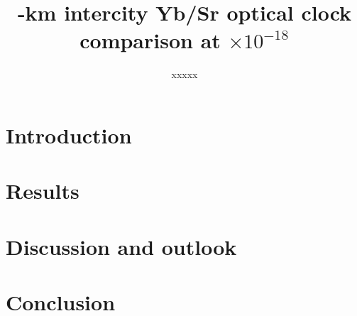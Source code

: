 \documentclass[11pt,a4paper]{article}
\title{\siteKm-km intercity Yb/Sr optical clock comparison at
\uTotalShort$\times10^{-18}$}
\author{%
  xxxxx%
}
\date{}
\begin{document}
\maketitle

\begin{abstract}
\sloppy

\end{abstract}

\section*{Introduction}
\label{sec:intro}


\section*{Results}
\label{sec:results}


\section*{Discussion and outlook}
\label{sec:discussion}


\section*{Conclusion}
\label{sec:conclusion}




\end{document}
